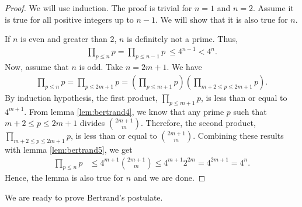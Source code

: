 \documentclass{subfile}
\begin{document}
	\begin{proof}
		We will use induction. The proof is trivial for $n=1$ and $n=2$. Assume it is true for all positive integers up to $n-1$. We will show that it is also true for $n$.

		If $n$ is even and greater than $2$, $n$ is definitely not a prime. Thus,
		\begin{align*}
			\prod_{p\leq n}p =  \prod_{p\leq n-1}p\ \leq  4^{n-1}<  4^n.
		\end{align*}
		Now, assume that $n$ is odd. Take $n=2m+1$. We have
		\begin{align*}
			\prod_{p\leq n}p =	\prod_{p\leq 2m+1} p  = \left(\prod_{p\leq m+1}p \right) \left( \prod_{m+2\leq p\leq2m+1}p\right).
		\end{align*}
		By induction hypothesis, the first product, $\prod\limits_{p\leq m+1}p$, is less than or equal to $4^{m+1}$. From lemma \eqref{lem:bertrand4}, we know that any prime $p$ such that $m+2\leq p\leq2m+1$ divides $\binom{2m+1}{m}$. Therefore, the second product, $\prod\limits_{m+2\leq p\leq2m+1}p$, is less than or equal to $\binom{2m+1}{m}$. Combining these results with lemma \eqref{lem:bertrand5}, we get
		\begin{align*}
			\prod_{p\leq n}p &\leq 4^{m+1}\binom{2m+1}{m}\leq 4^{m+1}2^{2m} =  4^{2m+1} = 4^n.
		\end{align*}
		Hence, the lemma is also true for $n$ and we are done.
	\end{proof}

	We are ready to prove Bertrand's postulate.
\end{document}
